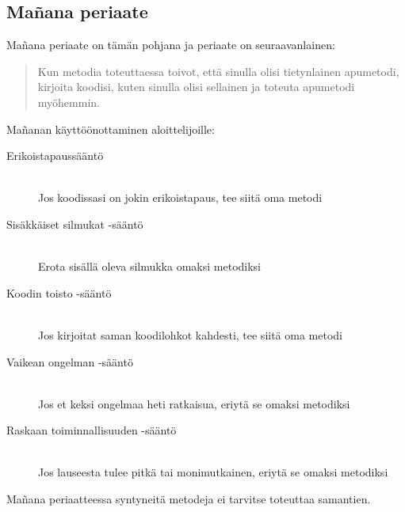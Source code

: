 \documentclass{tktltiki}
\begin{document}
\subsection{Mañana periaate}

Mañana periaate on tämän pohjana ja periaate on seuraavanlainen:

\begin{quotation}
Kun metodia toteuttaessa toivot, että sinulla olisi tietynlainen apumetodi, kirjoita koodisi, kuten sinulla olisi sellainen ja toteuta apumetodi myöhemmin.
\end{quotation}

Mañanan käyttöönottaminen aloittelijoille:

\begin{description}
  \item[Erikoistapaussääntö] \hfill \\
  Jos koodissasi on jokin erikoistapaus, tee siitä oma metodi
  \item[Sisäkkäiset silmukat -sääntö] \hfill \\
  Erota sisällä oleva silmukka omaksi metodiksi
  \item[Koodin toisto -sääntö] \hfill \\
  Jos kirjoitat saman koodilohkot kahdesti, tee siitä oma metodi
  \item[Vaikean ongelman -sääntö] \hfill \\
  Jos et keksi ongelmaa heti ratkaisua, eriytä se omaksi metodiksi
  \item[Raskaan toiminnallisuuden -sääntö] \hfill \\
  Jos lauseesta tulee pitkä tai monimutkainen, eriytä se omaksi metodiksi
\end{description}

Mañana periaatteessa syntyneitä metodeja ei tarvitse toteuttaa samantien.




\lastpage
\end{document}
